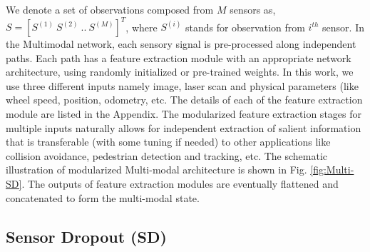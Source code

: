 \documentclass[../thesis.tex]{subfiles}
\begin{document}
We denote a set of observations composed from $M$ sensors as, $S = [S^{(1)}~S^{(2)}~..~S^{(M)}]^T$, where $S^{(i)}$ stands for observation from $i^{th}$ sensor. In the Multimodal network, each sensory signal is pre-processed along independent paths. Each path has a feature extraction module with an appropriate network architecture, using randomly initialized or pre-trained weights. In this work, we use three different inputs namely image, laser scan and physical parameters (like wheel speed, position, odometry, etc. The details of each of the feature extraction module are listed in the Appendix.
The modularized feature extraction stages for multiple inputs naturally allows for independent extraction of salient information that is transferable (with some tuning if needed) to other applications like collision avoidance, pedestrian detection and tracking, etc. 
The schematic illustration of modularized Multi-modal architecture is shown in Fig. \ref{fig:Multi-SD}. The outputs of feature extraction modules are eventually flattened and concatenated to form the multi-modal state. 

\subsection{Sensor Dropout (SD)} \label{sec:SD}
\end{document}
